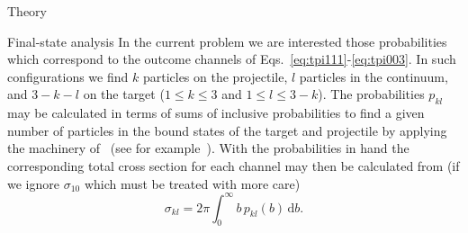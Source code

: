 \documentclass[aps, pra, reprint, groupedaddress, amsfonts,
               amsmath, amssymb, showpacs, nofootinbib]{revtex4-1}
\begin{document}
\begin{section}{Theory \label{sec:theory}}
\begin{subsection}{Final-state analysis \label{sec:probs}}
      In the current problem we are interested those probabilities which correspond to the outcome
      channels of Eqs.~\eqref{eq:tpi111}-\eqref{eq:tpi003}. In such configurations we find $k$ particles
      on the projectile, $l$ particles in the continuum, and $3 - k - l$ on the target ($1\leq k \leq 3$
      and $1 \leq l \leq 3 - k$). The probabilities $p_{kl}$ may be calculated in terms of sums of
      inclusive probabilities to find a given number of particles in the bound states of the target and
      projectile by applying the machinery of~\cite{inc-prob} (see for example~\cite{incEx, mitsuko12,
      gerald15}). With the probabilities in hand the corresponding total cross section for each channel
      may then be calculated from (if we ignore $\sigma_{10}$ which must be treated with more care)
      \begin{equation} \label{eq:cross}
         \sigma_{kl} = 2 \pi \int_0^\infty b \, p_{kl}(b) \, \mathrm{d}b.
      \end{equation}

   \end{subsection}

\end{section}
\end{document}
